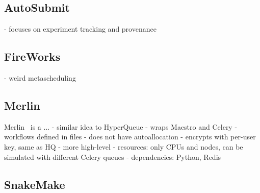 
\subsection*{AutoSubmit}

- focuses on experiment tracking and provenance

\subsection*{FireWorks}


- weird metascheduling

\subsection*{Merlin}

Merlin~\cite{merlin} is a ...  - similar idea to%
HyperQueue
- wraps Maestro and Celery
- workflows defined in files
- does not have autoallocation
- encrypts with per-user key, same as HQ
- more high-level
- resources: only CPUs and nodes, can be simulated with different Celery queues
- dependencies: Python, Redis

\subsection*{SnakeMake}

